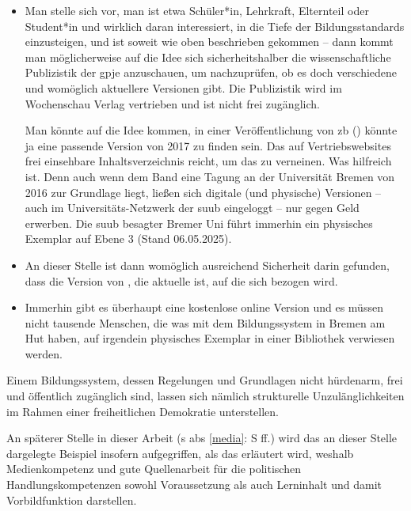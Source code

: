 \begin{itemize}
    \item Man stelle sich vor, man ist etwa Schüler*in, Lehrkraft, Elternteil oder Student*in und wirklich daran interessiert, in die Tiefe der Bildungsstandards einzusteigen, und ist soweit wie oben beschrieben gekommen -- dann kommt man möglicherweise auf die Idee sich sicherheitshalber die wissenschaftliche Publizistik der \gls{gpje} anzuschauen, um nachzuprüfen, ob es doch verschiedene und womöglich aktuellere Versionen gibt. Die Publizistik wird im Wochenschau Verlag vertrieben und ist nicht frei zugänglich. 
    
    Man könnte auf die Idee kommen, in einer Veröffentlichung von \citeyear{Gortler.2017} \gls{zb} (\citeauthor{Gortler.2017}) könnte ja eine passende Version von 2017 zu finden sein. Das auf Vertriebswebsites frei einsehbare Inhaltsverzeichnis reicht, um das zu verneinen. Was hilfreich ist. Denn auch wenn dem Band eine Tagung an der Universität Bremen von 2016 zur Grundlage liegt, ließen sich digitale (und physische) Versionen -- auch im Universitäts-Netzwerk der \gls{suub} eingeloggt -- nur gegen Geld erwerben. Die \gls{suub} besagter Bremer Uni führt immerhin ein physisches Exemplar auf Ebene 3 (Stand 06.05.2025). 

    \item An dieser Stelle ist dann womöglich ausreichend Sicherheit darin gefunden, dass die Version von \citeyear{gpje2004}, die aktuelle ist, auf die sich bezogen wird.

    \item Immerhin gibt es überhaupt eine kostenlose online Version und es müssen nicht tausende Menschen, die was mit dem Bildungssystem in Bremen am Hut haben, auf irgendein physisches Exemplar in einer Bibliothek verwiesen werden. %
\end{itemize}
Einem Bildungssystem, dessen Regelungen und Grundlagen nicht hürdenarm, frei und öffentlich zugänglich sind, lassen sich nämlich strukturelle Unzulänglichkeiten im Rahmen einer freiheitlichen Demokratie unterstellen. 

An späterer Stelle in dieser Arbeit (\gls{s} \gls{abs} \ref{media}: \gls{S} \pageref{media}ff.) wird das an dieser Stelle dargelegte Beispiel insofern aufgegriffen, als das erläutert wird, weshalb Medienkompetenz und gute Quellenarbeit für die politischen Handlungskompetenzen sowohl Voraussetzung als auch Lerninhalt und damit Vorbildfunktion darstellen. 

